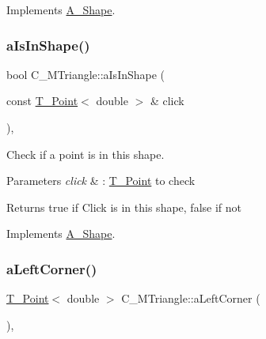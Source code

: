 Implements \hyperlink{classA__Shape_a63f825cbc9780208d9a137f5c14917d0}{A\+\_\+\+Shape}.

\mbox{\label{classC__MTriangle_ae29e4f6608a0079507c6397b3dbef246}} 
\subsubsection{\texorpdfstring{a\+Is\+In\+Shape()}{aIsInShape()}\hspace{0.1cm}{\footnotesize\ttfamily [2/2]}}
{\footnotesize\ttfamily bool C\+\_\+\+M\+Triangle\+::a\+Is\+In\+Shape (\begin{DoxyParamCaption}\item[{const \hyperlink{classT__Point}{T\+\_\+\+Point}$<$ double $>$ \&}]{click }\end{DoxyParamCaption})\hspace{0.3cm}{\ttfamily [override]}, {\ttfamily [virtual]}}



Check if a point is in this shape. 


\begin{DoxyParams}{Parameters}
{\em click} & \+: \hyperlink{classT__Point}{T\+\_\+\+Point} to check \\
\hline
\end{DoxyParams}
\begin{DoxyReturn}{Returns}
true if Click is in this shape, false if not 
\end{DoxyReturn}


Implements \hyperlink{classA__Shape_a63f825cbc9780208d9a137f5c14917d0}{A\+\_\+\+Shape}.

\mbox{\label{classC__MTriangle_ad077fce026711bf0a25fc4c1cb83ecb9}} 
\subsubsection{\texorpdfstring{a\+Left\+Corner()}{aLeftCorner()}\hspace{0.1cm}{\footnotesize\ttfamily [1/2]}}
{\footnotesize\ttfamily \hyperlink{classT__Point}{T\+\_\+\+Point}$<$ double $>$ C\+\_\+\+M\+Triangle\+::a\+Left\+Corner (\begin{DoxyParamCaption}{ }\end{DoxyParamCaption})\hspace{0.3cm}{\ttfamily [override]}, {\ttfamily [virtual]}}



